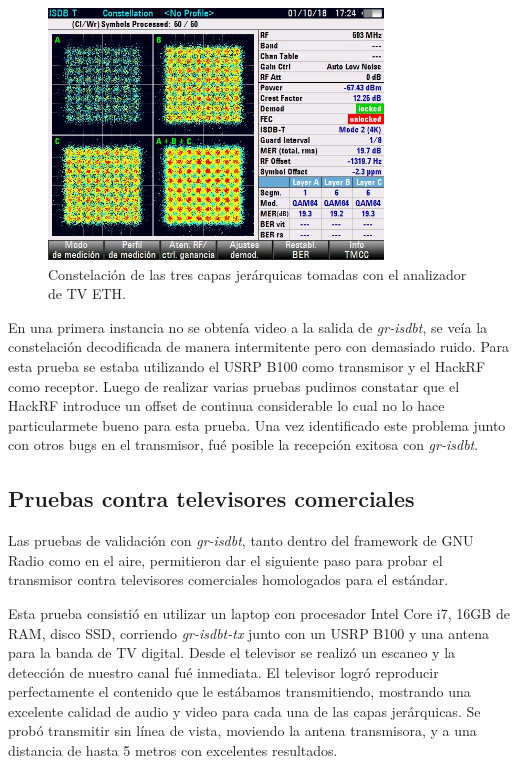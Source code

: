 \documentclass[journal,comsoc]{IEEEtran}
\begin{document}
\begin{figure}[!h]
\centering
\includegraphics[width=3.5in]{figuras/constelacion_eth}
\caption{Constelación de las tres capas jerárquicas tomadas con el analizador de TV ETH.}
\label{const_eth}
\end{figure}


En una primera instancia no se obtenía video a la salida de \textit{gr-isdbt}, se veía la constelación decodificada de manera intermitente pero con demasiado ruido. Para esta prueba se estaba utilizando el USRP B100 como transmisor y el HackRF como receptor. Luego de realizar varias pruebas pudimos constatar que el HackRF introduce un offset de continua considerable lo cual no lo hace particularmete bueno para esta prueba. Una vez identificado este problema junto con otros bugs en el transmisor, fué posible la recepción exitosa con \textit{gr-isdbt}. 

\subsection{Pruebas contra televisores comerciales}
Las pruebas de validación con \textit{gr-isdbt}, tanto dentro del framework de GNU Radio como en el aire, permitieron dar el siguiente paso para probar el transmisor contra televisores comerciales homologados para el estándar.  

Esta prueba consistió en utilizar un laptop con procesador Intel Core i7, 16GB de RAM, disco SSD, corriendo \textit{gr-isdbt-tx} junto con un USRP B100 y una antena para la banda de TV digital. Desde el televisor se realizó un escaneo y la detección de nuestro canal fué inmediata. El televisor logró reproducir perfectamente el contenido que le estábamos transmitiendo, mostrando una excelente calidad de audio y video para cada una de las capas jerárquicas. Se probó transmitir sin línea de vista, moviendo la antena transmisora, y a una distancia de hasta 5 metros con excelentes resultados. 
\end{document}
